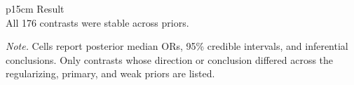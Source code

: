 \begin{table}[tbp]
\caption{RQ3 importance contrasts with prior-dependent inferential conclusions.}
\label{tab:rq3_importance_prior_sensitive_contrasts}
\begin{tabular}{p{15cm}}
\toprule
Result \\
\midrule
All 176 contrasts were stable across priors. \\
\bottomrule
\end{tabular}

\noindent\begin{minipage}{\linewidth}
\footnotesize\textit{Note.} Cells report posterior median ORs, 95\% credible intervals, and inferential conclusions. Only contrasts whose direction or conclusion differed across the regularizing, primary, and weak priors are listed.
\end{minipage}

\end{table}
